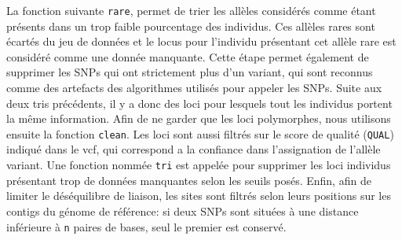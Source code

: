 La fonction suivante \verb|rare|, permet de trier les allèles considérés comme étant présents dans un trop faible pourcentage des individus. Ces allèles rares sont écartés du jeu de données et le locus pour l'individu présentant cet allèle rare est considéré comme une donnée manquante.
  Cette étape permet également de supprimer les SNPs qui ont strictement plus d'un variant, qui sont reconnus comme des artefacts des algorithmes utilisés pour appeler les SNPs.
 Suite aux deux tris précédents, il y a donc des loci pour lesquels tout les individus portent la même information. Afin de ne garder que les loci polymorphes, nous utilisons ensuite la fonction \verb|clean|. Les loci sont aussi filtrés sur le score de qualité (\verb|QUAL|) indiqué dans le vcf, qui correspond a la confiance dans l'assignation de l'allèle variant.
 Une fonction nommée \verb|tri| est appelée pour supprimer les loci \DIFdelbegin {}\DIFdelend \DIFaddbegin {}\DIFaddend individus présentant trop de données manquantes selon les seuils posés.
 Enfin, afin de limiter le déséquilibre de liaison, les sites sont filtrés selon leurs positions sur les contigs du génome de référence: si deux SNPs sont situées à une distance inférieure à \verb|n| paires de bases, seul le premier est conservé.


